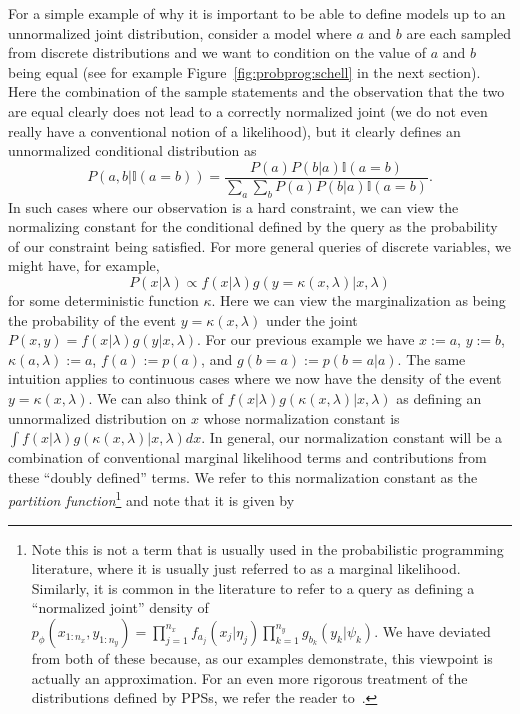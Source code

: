 For a simple example of why it is important to be able to define models up to an unnormalized joint
distribution, consider a model where $a$ and $b$ are each sampled from discrete distributions
and we want to condition on the value of $a$ and $b$ being equal (see for example Figure~\ref{fig:probprog:schell}
in the next section).  Here
the combination of the sample statements and the observation that the two are equal clearly
does not lead to a correctly normalized joint (we do not even really have a conventional notion
of a likelihood), but it clearly defines an unnormalized conditional distribution as
\[
P(a,b | \mathbb{I}(a=b)) = \frac{P(a)P(b|a)\mathbb{I}(a=b)}{\sum_a \sum_b P(a)P(b|a) \mathbb{I}(a=b)}.
\]
In such cases where our observation is a hard constraint, we can view the normalizing constant for
the conditional defined by the query as the probability of our constraint being satisfied.  
For more general queries of discrete variables, we might have, for example,
\[
P(x|\lambda) \propto f(x|\lambda)g(y=\kappa(x,\lambda)|x,\lambda)
\]
for some deterministic function $\kappa$.  Here we
can view the marginalization as being the probability of the event $y=\kappa(x,\lambda)$ under the joint $P(x,y)=f(x|\lambda)g(y|x,\lambda)$.
For our previous example we have $x:=a$, $y:=b$, $\kappa(a,\lambda):=a$, $f(a):=p(a)$, and $g(b=a):=p(b=a|a)$.
The same intuition applies to continuous cases where we now have the density of the event $y=\kappa(x,\lambda)$.
We can also think of $f(x|\lambda)g(\kappa(x,\lambda)|x,\lambda)$ as defining an unnormalized distribution on $x$ whose
normalization constant is $\int f(x|\lambda)g(\kappa(x,\lambda)|x,\lambda) dx$.  In general, our normalization
constant will be a combination of conventional marginal likelihood terms and contributions from these ``doubly defined''
terms. We refer to this normalization constant as the \emph{partition function}\footnote{Note this is not a
	term that is usually used in the probabilistic programming literature, where it is usually just referred to as a marginal
	likelihood.  Similarly, it is common in the literature to refer to a query as defining a ``normalized 
	joint'' density of $p_{\phi}(x_{1:n_x},y_{1:n_y}) = \prod_{j=1}^{n_x} f_{a_j}(x_j | \eta_j)
	\prod_{k=1}^{n_y} g_{b_k}(y_k | \psi_k)$.  We have deviated from both of these because, as our examples
	demonstrate, this viewpoint is actually an approximation.  
	For an even more rigorous treatment of the distributions defined by PPSs, we refer the reader to~\cite{staton2016semantics}. 
	} and note that it is given by
